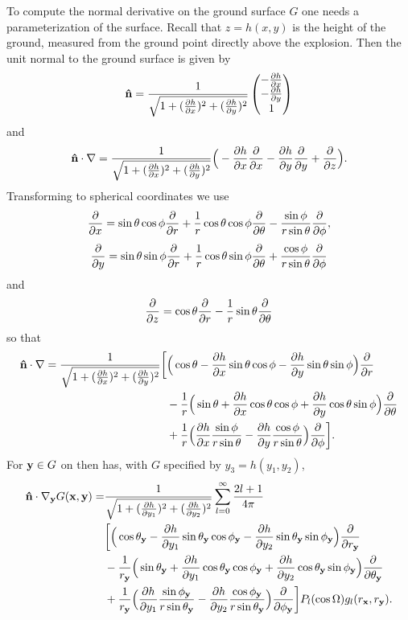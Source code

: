 To compute the normal derivative on the ground surface $G$ one needs a parameterization of the surface. Recall that $z=h(x,y)$ is the height of the ground, measured from the ground point directly above the explosion. Then the unit normal to the ground surface is given by 
\[
{\bf \hat n}
=
\frac{1}{\sqrt{1+(\frac{\partial h}{\partial x})^2+(\frac{\partial h}{\partial y})^2}}
\begin{pmatrix}-\frac{\partial h}{\partial x}\\-\frac{\partial h}{\partial y}\\1\end{pmatrix}
\]
and
\[
{\bf \hat n}\cdot\nabla
=
\frac{1}{\sqrt{1+(\frac{\partial h}{\partial x})^2+(\frac{\partial h}{\partial y})^2}}
\Big(
-\frac{\partial h}{\partial x}\frac{\partial}{\partial x}-\frac{\partial h}{\partial y}\frac{\partial}{\partial y}
+\frac{\partial}{\partial z}
\Big).
\]
Transforming to spherical coordinates we use
\[
\frac{\partial}{\partial x}
=
\sin\theta\cos\phi\frac{\partial}{\partial r}
+
\frac{1}{ r}\cos\theta\cos\phi\frac{\partial}{\partial \theta}
-
\frac{\sin\phi}{ r\sin\theta}\frac{\partial}{\partial \phi},
\]
\[
\frac{\partial}{\partial y}
=
\sin\theta\sin\phi\frac{\partial}{\partial r}
+
\frac{1}{ r}\cos\theta\sin\phi\frac{\partial}{\partial \theta}
+
\frac{\cos\phi}{ r\sin\theta}\frac{\partial}{\partial \phi}
\]
and
\[
\frac{\partial}{\partial z}
=
\cos\theta\frac{\partial}{\partial r}
-\frac{1}{ r}\sin\theta\frac{\partial}{\partial \theta}
\]
so that 
\begin{align*}
{\bf \hat n}\cdot\nabla
=
\frac{1}{\sqrt{1+(\frac{\partial h}{\partial x})^2+(\frac{\partial h}{\partial y})^2}}
\bigg[&
\Big(\cos\theta-\frac{\partial h}{\partial x}\sin\theta\cos\phi
-\frac{\partial h}{\partial y}\sin\theta\sin\phi\Big)\frac{\partial}{\partial r}\\
&-
\frac{1}{r}\Big(\sin\theta+\frac{\partial h}{\partial x}\cos\theta\cos\phi
+\frac{\partial h}{\partial y}\cos\theta\sin\phi\Big)\frac{\partial}{\partial \theta}\\
&+
\frac{1}{r}\Big(\frac{\partial h}{\partial x}\frac{\sin\phi}{ r\sin\theta}
-\frac{\partial h}{\partial y}\frac{\cos\phi}{ r\sin\theta}\Big)\frac{\partial}{\partial \phi}
\bigg].
\end{align*}
For ${\bf y}\in G$ on then has, with $G$ specified by $y_3=h(y_1,y_2)$, 
\begin{align*}
{\bf \hat n}\cdot\nabla_{\bf y} G({\bf x},{\bf y})
=&
\frac{1}{\sqrt{1+(\frac{\partial h}{\partial y_1})^2+(\frac{\partial h}{\partial y_2})^2}}
\sum_{l=0}^\infty\frac{2l+1}{4\pi}\\
&\bigg[
\Big(\cos\theta_{\bf y}-\frac{\partial h}{\partial y_1}\sin\theta_{\bf y}\cos\phi_{\bf y}
-\frac{\partial h}{\partial y_2}\sin\theta_{\bf y}\sin\phi_{\bf y}\Big)\frac{\partial}{\partial r_{\bf y}}\\
&-
\frac{1}{r_{\bf y}}\Big(\sin\theta_{\bf y}+\frac{\partial h}{\partial y_1}\cos\theta_{\bf y}\cos\phi_{\bf y}
+\frac{\partial h}{\partial y_2}\cos\theta_{\bf y}\sin\phi_{\bf y}\Big)\frac{\partial}{\partial \theta_{\bf y}}\\
&+
\frac{1}{r_{\bf y}}\Big(\frac{\partial h}{\partial y_1}\frac{\sin\phi_{\bf y}}{ r\sin\theta_{\bf y}}
-\frac{\partial h}{\partial y_2}\frac{\cos\phi_{\bf y}}{ r\sin\theta_{\bf y}}\Big)\frac{\partial}{\partial \phi_{\bf y}}
\bigg]P_l(\cos\Omega)g_l(r_{\bf x},r_{\bf y}).
\end{align*}
